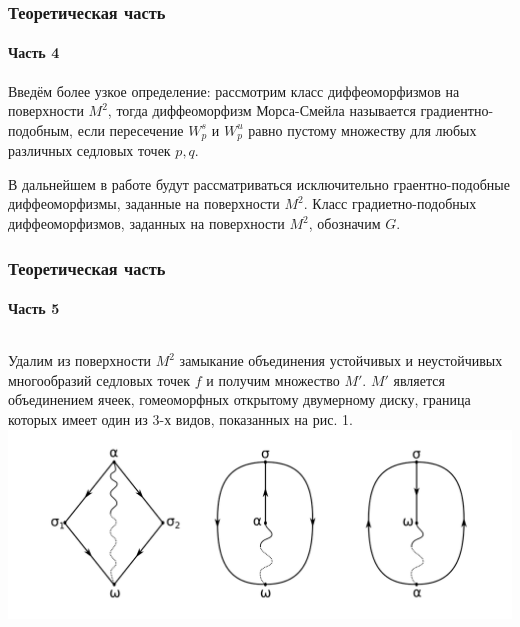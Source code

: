 \documentclass[aspectratio=169]{beamer}
\begin{document}
\begin{frame}
	\frametitle{Теоретическая часть}
	\framesubtitle{Часть 4}
	Введём более узкое определение: рассмотрим класс диффеоморфизмов на поверхности $M^2$, тогда диффеоморфизм Морса-Смейла называется градиентно-подобным, если пересечение $W^s_p$ и $W^u_p$ равно пустому множеству для любых различных седловых точек $p,q$.
	\par В дальнейшем в работе будут рассматриваться исключительно граентно-подобные диффеоморфизмы, заданные на поверхности $M^2$. Класс градиетно-подобных диффеоморфизмов, заданных на поверхности $M^2$, обозначим $G$.
\end{frame}
\begin{frame}
	\frametitle{Теоретическая часть}
	\framesubtitle{Часть 5}
	\medskip
	\begin{columns}
		Удалим из поверхности $M^2$ замыкание объединения устойчивых и неустойчивых многообразий седловых точек $f$ и получим множество $M'$.
		$M'$ является объединением ячеек, гомеоморфных открытому двумерному диску, граница которых имеет один из 3-х видов, показанных на рис. 1.
		\includegraphics[width=\columnwidth]{Cells}
	\end{columns}
\end{frame}
\end{document}
